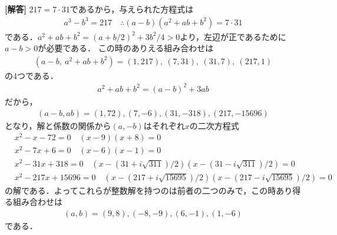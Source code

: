 \documentclass[../../main.tex]{subfiles}
\begin{document}
\begin{oframed}
  
\end{oframed}

{\bf [解答]}
$217=7\cdot31$であるから，与えられた方程式は
\begin{align}
  a^3 - b^3 = 217
  \quad\therefore
  (a-b)(a^2+ab+b^2)=7\cdot31\label{eq:1}
\end{align}
である．$a^2+ab+b^2=(a+b/2)^2+3b^2/4>0$より，左辺が正であるために$a-b>0$が必要である．
この時のありえる組み合わせは
\begin{align}
  (a-b,\ a^2+ab+b^2)=(1,217),\ (7,31),\ (31,7),\ (217,1)
\end{align}
の$4$つである．
\begin{align}
  a^2+ab+b^2 = (a-b)^2+3ab
\end{align}
だから，
\begin{align}
  (a-b, ab) = (1,72), (7,-6), (31, -318), (217, -15696)
\end{align}
となり，解と係数の関係から$(a,-b)$はそれぞれ$x$の二次方程式
\begin{align}
  & x^2 - x - 72 = 0 \quad (x-9)(x+8)=0 \\
  & x^2 - 7x + 6 = 0 \quad (x-6)(x-1)=0 \\
  & x^2 -31x +318 = 0 \quad (x-(31+i\sqrt{311})/2)(x-(31-i\sqrt{311})/2)=0 \\
  & x^2 - 217x + 15696 = 0 \quad (x-(217+i\sqrt{15695})/2)(x-(217-i\sqrt{15695})/2)=0
\end{align}
の解である．よってこれらが整数解を持つのは前者の二つのみで，この時あり得る組み合わせは
\begin{align}
  (a,b) = (9,8), (-8,-9), (6,-1), (1,-6)
\end{align}
である．

\newpage
\end{document}
